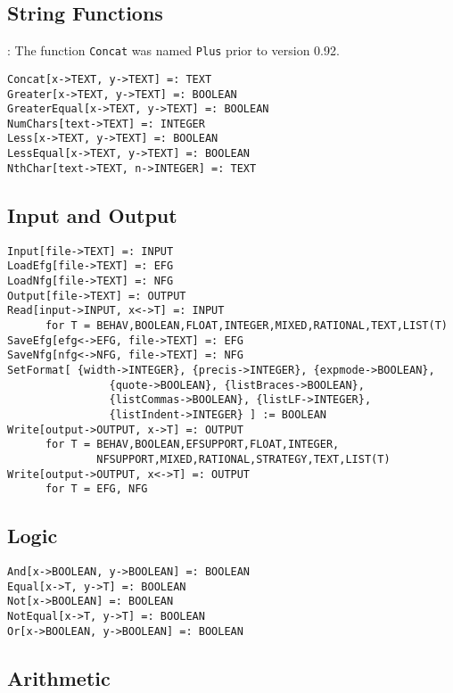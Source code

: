 \subsection{String Functions}

: The function {\tt Concat} was named {\tt Plus}
prior to version 0.92.

\begin{verbatim}
Concat[x->TEXT, y->TEXT] =: TEXT
Greater[x->TEXT, y->TEXT] =: BOOLEAN
GreaterEqual[x->TEXT, y->TEXT] =: BOOLEAN
NumChars[text->TEXT] =: INTEGER
Less[x->TEXT, y->TEXT] =: BOOLEAN
LessEqual[x->TEXT, y->TEXT] =: BOOLEAN
NthChar[text->TEXT, n->INTEGER] =: TEXT
\end{verbatim}


\subsection{Input and Output}

\begin{verbatim}
Input[file->TEXT] =: INPUT
LoadEfg[file->TEXT] =: EFG
LoadNfg[file->TEXT] =: NFG
Output[file->TEXT] =: OUTPUT
Read[input->INPUT, x<->T] =: INPUT  
      for T = BEHAV,BOOLEAN,FLOAT,INTEGER,MIXED,RATIONAL,TEXT,LIST(T)
SaveEfg[efg<->EFG, file->TEXT] =: EFG
SaveNfg[nfg<->NFG, file->TEXT] =: NFG
SetFormat[ {width->INTEGER}, {precis->INTEGER}, {expmode->BOOLEAN},
                {quote->BOOLEAN}, {listBraces->BOOLEAN},
                {listCommas->BOOLEAN}, {listLF->INTEGER},
                {listIndent->INTEGER} ] := BOOLEAN
Write[output->OUTPUT, x->T] =: OUTPUT  
      for T = BEHAV,BOOLEAN,EFSUPPORT,FLOAT,INTEGER,
              NFSUPPORT,MIXED,RATIONAL,STRATEGY,TEXT,LIST(T)
Write[output->OUTPUT, x<->T] =: OUTPUT 
      for T = EFG, NFG
\end{verbatim}

\subsection{Logic}

\begin{verbatim}
And[x->BOOLEAN, y->BOOLEAN] =: BOOLEAN
Equal[x->T, y->T] =: BOOLEAN
Not[x->BOOLEAN] =: BOOLEAN
NotEqual[x->T, y->T] =: BOOLEAN
Or[x->BOOLEAN, y->BOOLEAN] =: BOOLEAN
\end{verbatim}

\subsection{Arithmetic}

